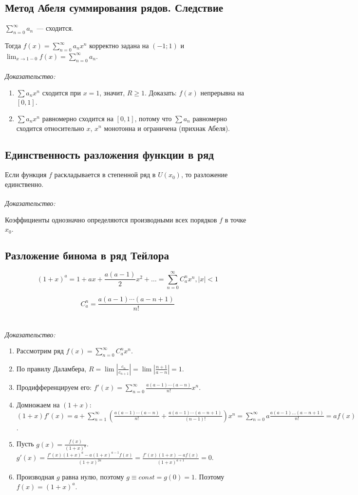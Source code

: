 \documentclass[paper=a4, fontsize=11pt]{article}
\begin{document}
\subsection{Метод Абеля суммирования рядов. Следствие}
$\sum_{n=0}^{\infty}a_n$~--- сходится.

Тогда $f(x) = \sum_{n=0}^{\infty}a_n x^n$ корректно задана на $(-1;1)$ и $\lim_{x \to 1-0} f(x) = \sum_{n=0}^{\infty}a_n$.
\\\\
\emph{Доказательство:}
\begin{enumerate}
    \item $\sum a_n x^n$ сходится при $x = 1$, значит, $R \geq 1$. Доказать: $f(x)$ непрерывна на $[0,1]$.
    \item $\sum a_n x^n$ равномерно сходится на $[0,1]$, потому что $\sum a_n$ равномерно сходится относительно $x$,
    $x^n$ монотонна и ограничена (прихнак Абеля).
\end{enumerate}

\subsection{Единственность разложения функции в ряд}
Если функция $f$ раскладывается в степенной ряд в $U(x_0)$, то разложение единственно.
\\\\
\emph{Доказательство:}

Коэффициенты однозначно определяются производными всех порядков $f$ в точке $x_0$.

\subsection{Разложение бинома в ряд Тейлора}
$$(1+x)^a = 1 + ax + \frac{a(a-1)}{2}x^2 + \dots = \sum_{n=0}^{\infty} C_a^n x^n, |x|<1$$

$$C_a^n = \frac{a(a-1)\cdots(a-n+1)}{n!}$$
\\\\
\emph{Доказательство:}
\begin{enumerate}
    \item Рассмотрим ряд $f(x) = \sum_{n=0}^{\infty} C_a^n x^n$.
    \item По правилу Даламбера, $R = \lim |\frac{c_n}{c_{n+1}}| = \lim |\frac{n+1}{a-n}| = 1$.
    \item Продифференцируем его: $f'(x) = \sum_{n=0}^{\infty} \frac{a(a-1)\cdots(a-n)}{n!} x^n$.
    \item Домножаем на $(1+x)$:
    $(1+x)f'(x) = a + \sum_{n=1}^{\infty} (\frac{a(a-1)\cdots(a-n)}{n!} + \frac{a(a-1)\cdots(a-n+1)}{(n-1)!}) x^n =
    \sum_{n=0}^{\infty} a\frac{a(a-1)\dots(a-n+1)}{n!} = af(x)$.
    \item Пусть $g(x) = \frac{f(x)}{(1+x)^a}$. $g'(x) = \frac{f'(x)(1+x)^a - a(1+x)^{a-1}f(x)}{(1+x)^{2a}} =
    \frac{f'(x)(1+x) - af(x)}{(1+x)^{a+1}} = 0$.
    \item Производная $g$ равна нулю, поэтому $g \equiv const = g(0) = 1$. Поэтому $f(x) = (1+x)^a$.
\end{enumerate}
\end{document}
